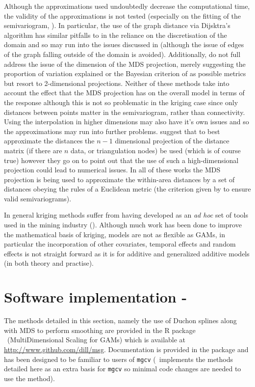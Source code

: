 Although the approximations used undoubtedly decrease the computational time, the validity of the approximations is not tested (especially on the fitting of the semivariogram, ). In particular, the use of the graph distance via Dijsktra's algorithm has similar pitfalls to  in the reliance on the discretisation of the domain and so may run into the issues discussed in  (although the issue of edges of the graph falling outside of the domain is avoided). Additionally,  do not full address the issue of the dimension of the MDS projection, merely suggesting the proportion of variation explained or the Bayesian criterion of  as possible metrics but resort to 2-dimensional projections. Neither of these methods take into account the effect that the MDS projection has on the overall model in terms of the response although this is not so problematic in the kriging case since only distances between points matter in the semivariogram, rather than connectivity. Using the interpolation in higher dimensions may also have it's own issues and so the approximations may run into further problems.  suggest that to best approximate the distances the $n-1$ dimensional projection of the distance matrix (if there are $n$ data, or triangulation nodes) be used (which is of course true) however they go on to point out that the use of such a high-dimensional projection could lead to numerical issues. In all of these works the MDS projection is being used to approximate the within-area distances by a set of distances obeying the rules of a Euclidean metric (the criterion given by  to ensure valid semivariograms). 

In general kriging methods suffer from having developed as an \textit{ad hoc} set of tools used in the mining industry (\cite[preface]{diggle}). Although much work has been done to improve the mathematical basis of kriging, models are not as flexible as GAMs, in particular the incorporation of other covariates, temporal effects and random effects is not straight forward as it is for additive and generalized additive models (in both theory and practise).

\section{Software implementation - \mdspack}
\label{gds-software}

The methods detailed in this section, namely the use of Duchon splines along with MDS to perform smoothing are provided in the \textsf{R} package \mdspack\ (MultiDimensional Scaling for GAMs) which is available at \url{http://www.github.com/dill/msg}. Documentation is provided in the package and has been designed to be familiar to users of \texttt{mgcv} (\mdspack\ implements the methods detailed here as an extra basis for \texttt{mgcv} so minimal code changes are needed to use the method).




